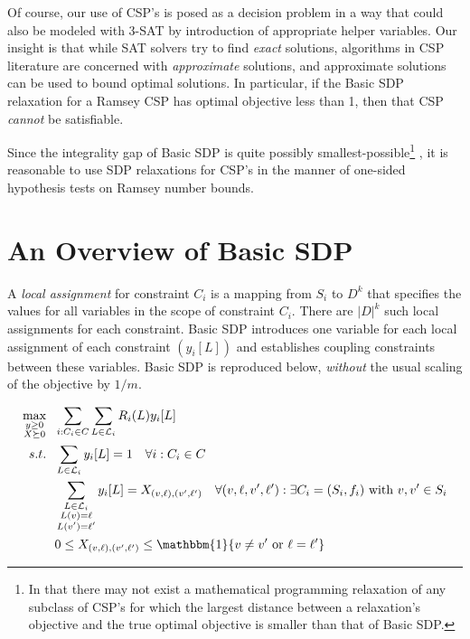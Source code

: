 \documentclass[12pt]{article} %
\begin{document}
Of course, our use of CSP's is posed as a decision problem in a way that could also be modeled with 3-SAT by introduction of appropriate helper variables. Our insight is that while SAT solvers try to find \textit{exact} solutions, algorithms in CSP literature are concerned with \textit{approximate} solutions, and approximate solutions can be used to bound optimal solutions. In particular, if the Basic SDP relaxation for a Ramsey CSP has optimal objective less than 1, then that CSP \textit{cannot} be satisfiable. 

Since the integrality gap of Basic SDP is quite possibly smallest-possible\footnote{In that there may not exist a mathematical programming relaxation of any subclass of CSP's for which the largest distance between a relaxation's objective and the true optimal objective is smaller than that of Basic SDP.} \cite{raghavendra2008optimal}, it is reasonable to use SDP relaxations for CSP's in the manner of one-sided hypothesis tests on Ramsey number bounds.

\section{An Overview of Basic SDP}

A \emph{local assignment} for constraint $C_i$ is a mapping from $S_i$ to $D^k$ that specifies the values for all variables in the scope of constraint $C_i$. There are $|D|^k$ such local assignments for each constraint. Basic SDP introduces one variable for each local assignment of each constraint $(y_i[L])$ and establishes coupling constraints between these variables. Basic SDP \cite{raghavendra2008optimal} is reproduced below, \emph{without} the usual scaling of the objective by $1/m$.

\begin{align}
\operatorname*{max}_{\substack{y \geq 0 \\  X \succeq 0}} ~ & ~ \sum\limits_{i:C_i\in C} \sum\limits_{L\in \mathcal{L}_i} R_i(L)y_i[L] \nonumber  \\
s.t. ~ & ~ \sum\limits_{L \in \mathcal{L}_i} y_i[L] = 1  \quad \forall i : C_i \in C \\
& ~ \sum\limits_{\substack{L \in \mathcal{L}_i \\ L(v)=\ell \\ L(v')=\ell '}} y_i[L] = X_{(v,\ell),(v',\ell')}  \quad \forall (v,\ell,v',\ell') : \exists C_i = (S_i, f_i) \text{ with } v,v' \in S_i \\
& ~ 0 \leq  X_{(v,\ell),(v',\ell')}  \leq \mathbbm{1}\{ v \neq v' \text{ or } \ell = \ell' \}
\end{align}
\end{document}
